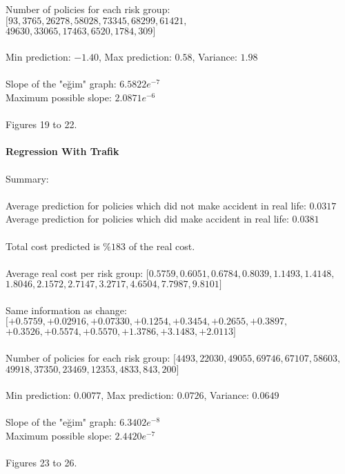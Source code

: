 \documentclass[titlepage, a4paper, 14pt]{extarticle} %
\begin{document}
Number of policies for each risk group:\\ $[93, 3765, 26278, 58028,73345, 68299, 61421,$\\$ 49630, 33065, 17463, 6520, 1784, 309]$ \\\\
Min prediction: $-1.40$, Max prediction: $0.58$, Variance: $1.98$ \\\\
Slope of the "eğim" graph: $6.5822 e^{-7}$ \\
Maximum possible slope:  $2.0871 e^{-6}$ \\\\
Figures 19 to 22.\\\\
\textbf{Regression With Trafik}\\\\
Summary: \\\\
Average prediction for policies which did not make accident in real life: $0.0317$ \\
Average prediction for policies which did make accident in real life: $0.0381$ \\\\
Total cost predicted is $\%183$ of the real cost. \\\\
Average real cost per risk group: $[0.5759, 0.6051, 0.6784, 0.8039, 1.1493, 1.4148,$\\$ 1.8046, 2.1572, 2.7147, 3.2717, 4.6504, 7.7987, 9.8101]$ \\\\
Same information as change: $[+0.5759, +0.02916, +0.07330, +0.1254, +0.3454, +0.2655, +0.3897,$\\$ +0.3526, +0.5574, +0.5570, +1.3786, +3.1483, +2.0113]$ \\\\
Number of policies for each risk group: $[4493, 22030, 49055, 69746, 67107, 58603,$\\$ 49918, 37350, 23469, 12353, 4833, 843, 200]$\\\\
Min prediction: $0.0077$, Max prediction: $0.0726$, Variance: $0.0649$ \\\\
Slope of the "eğim" graph: $6.3402 e^{-8}$ \\
Maximum possible slope:  $2.4420 e^{-7}$ \\\\
Figures 23 to 26.\\\\
\end{document}
